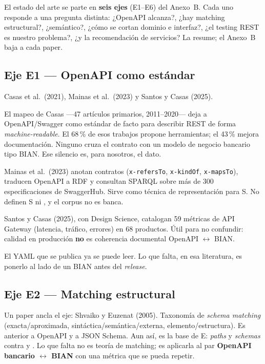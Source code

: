 El estado del arte se parte en \textbf{seis ejes} (E1--E6) del Anexo~B. Cada uno responde a una
pregunta distinta: ¿OpenAPI alcanza?, ¿hay matching estructural?, ¿semántico?, ¿cómo se cortan
dominio e interfaz?, ¿el testing REST es nuestro problema?, ¿y la recomendación de servicios?
La  resume; el Anexo~B baja a cada paper.

\subsection{Eje E1 --- OpenAPI como estándar}

Casas et al.\ (2021), Mainas et al.\ (2023) y Santos y Casas (2025).

El mapeo de Casas ---47 artículos primarios, 2011--2020--- deja a OpenAPI/Swagger como estándar de
facto para describir REST de forma \textit{machine-readable}. El 68\,\% de esos trabajos propone
herramientas; el 43\,\% mejora documentación. Ninguno cruza el contrato con un modelo de negocio
bancario tipo BIAN. Ese silencio es, para nosotros, el dato.

Mainas et al.\ (2023) anotan contratos (\texttt{x-refersTo}, \texttt{x-kindOf}, \texttt{x-mapsTo}),
traducen OpenAPI a RDF y consultan SPARQL sobre más de 300 especificaciones de SwaggerHub. Sirve
como técnica de representación para S. No definen S ni \AlignmentScore{}, y el corpus no es banca.

Santos y Casas (2025), con Design Science, catalogan 59 métricas de API Gateway (latencia, tráfico,
errores) en 68 productos. Útil para no confundir: calidad en producción \textbf{no} es coherencia
documental OpenAPI $\leftrightarrow$ BIAN.

El YAML que se publica ya se puede leer. Lo que falta, en esa literatura, es ponerlo al lado de un
\ServiceDomain{} BIAN antes del \textit{release}.

\subsection{Eje E2 --- Matching estructural}

Un paper ancla el eje: Shvaiko y Euzenat (2005). Taxonomía de \textit{schema matching}
(exacta/aproximada, sintáctica/semántica/externa, elemento/estructura). Es anterior a OpenAPI y a
JSON Schema. Aun así, es la base de E: \textit{paths} y \textit{schemas} contra \Behavior{} y
\BusinessObject{}. Lo que falta no es teoría de matching; es aplicarla al par
\textbf{OpenAPI bancario $\leftrightarrow$ BIAN} con una métrica que se pueda repetir.

